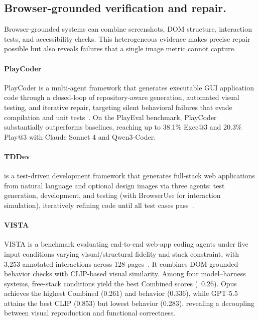 \subsection{Browser-grounded verification and repair.}
Browser-grounded systems can combine screenshots, DOM structure, interaction tests, and accessibility checks. This heterogeneous evidence makes precise repair possible but also reveals failures that a single image metric cannot capture.


\paragraph{PlayCoder}
PlayCoder is a multi-agent framework that generates executable GUI application code through a closed-loop of repository-aware generation, automated visual testing, and iterative repair, targeting silent behavioral failures that evade compilation and unit tests~\cite{avg260419742}. On the PlayEval benchmark, PlayCoder substantially outperforms baselines, reaching up to 38.1\% Exec@3 and 20.3\% Play@3 with Claude Sonnet 4 and Qwen3-Coder.

\paragraph{TDDev}
 is a test-driven development framework that generates full-stack web applications from natural language and optional design images via three agents: test generation, development, and testing (with BrowserUse for interaction simulation), iteratively refining code until all test cases pass~\cite{avg250925297}.

\paragraph{VISTA}
VISTA is a benchmark evaluating end-to-end web-app coding agents under five input conditions varying visual/structural fidelity and stack constraint, with 3,253 annotated interactions across 128 pages~\cite{avg260526144}. It combines DOM-grounded behavior checks with CLIP-based visual similarity. Among four model–harness systems, free-stack conditions yield the best Combined scores (~0.26). Opus achieves the highest Combined (0.261) and behavior (0.336), while GPT-5.5 attains the best CLIP (0.853) but lowest behavior (0.283), revealing a decoupling between visual reproduction and functional correctness.

